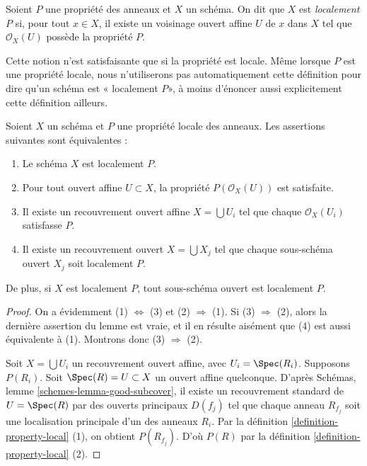 \begin{definition}
\label{definition-locally-P}
Soient $P$ une propriété des anneaux et $X$ un schéma. On
dit que $X$ est {\it localement $P$} si, pour tout $x \in X$,
il existe un voisinage ouvert affine $U$ de $x$
dans $X$ tel que $\mathcal{O}_X(U)$ possède la propriété $P$.
\end{definition}

\noindent
Cette notion n'est satisfaisante que si la propriété est locale.
Même lorsque $P$ est une propriété locale, nous
n'utiliserons pas automatiquement cette définition pour dire qu'un schéma est «
localement $P$», à moins d'énoncer aussi explicitement cette
définition ailleurs.

\begin{lemma}
\label{lemma-locally-P}
Soient $X$ un schéma et $P$ une propriété locale des anneaux. Les
assertions suivantes sont équivalentes :
\begin{enumerate}
\item Le schéma $X$ est localement $P$.
\item Pour tout ouvert affine $U \subset X$, la propriété
$P(\mathcal{O}_X(U))$ est satisfaite.
\item Il existe un recouvrement ouvert affine $X = \bigcup U_i$ tel que
chaque $\mathcal{O}_X(U_i)$ satisfasse $P$.
\item Il existe un recouvrement ouvert $X = \bigcup X_j$
tel que chaque sous-schéma ouvert $X_j$ soit localement $P$.
\end{enumerate}
De plus, si $X$ est localement $P$, tout sous-schéma ouvert est
localement $P$.
\end{lemma}

\begin{proof}
On a évidemment (1) $\Leftrightarrow$ (3) et (2) $\Rightarrow$ (1).
Si (3) $\Rightarrow$ (2), alors la dernière assertion du lemme est
vraie, et il en résulte aisément que (4) est aussi équivalente à (1).
Montrons donc (3) $\Rightarrow$ (2).

\medskip\noindent
Soit $X = \bigcup U_i$ un recouvrement ouvert affine, avec
$U_i = \Spec(R_i)$. Supposons $P(R_i)$.
Soit $\Spec(R) = U \subset X$ un ouvert affine quelconque.
D'après Schémas, lemme \ref{schemes-lemma-good-subcover},
il existe un recouvrement standard de $U = \Spec(R)$ par
des ouverts principaux $D(f_j)$ tel que chaque anneau $R_{f_j}$ soit
une localisation principale d'un des anneaux $R_i$. Par
la définition \ref{definition-property-local} (1), on obtient $P(R_{f_j})$.
D'où $P(R)$ par la définition \ref{definition-property-local} (2).
\end{proof}

